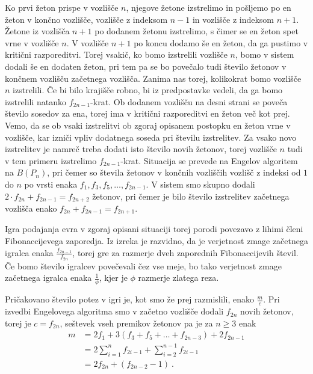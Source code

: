 \documentclass[twoside,11pt]{article}
\begin{document}
\begin{dokaz}
\begin{itemize}
    Ko prvi žeton prispe v vozlišče $n$, njegove žetone izstrelimo in pošljemo po en žeton v končno vozlišče, vozlišče z indeksom $n-1$ in vozlišče z indeksom $n+1$. Žetone iz vozlišča $n+1$ po dodanem žetonu izstrelimo, s čimer se en žeton spet vrne v vozlišče $n$.
    V vozlišče $n+1$ po koncu dodamo še en žeton, da ga pustimo v kritični razporeditvi. Torej vsakič, ko bomo izstrelili vozlišče $n$, bomo v sistem dodali še en dodaten žeton, pri tem pa se bo povečalo tudi število žetonov v končnem vozlišču začetnega vozlišča.
    Zanima nas torej, kolikokrat bomo vozlišče $n$ izstrelili. Če bi bilo krajišče robno, bi iz predpostavke vedeli, da ga bomo izstrelili natanko $f_{2n-1}$-krat. Ob dodanem vozlišču na desni strani se poveča število sosedov za ena, torej ima v kritični razporeditvi en žeton več kot prej.
    Vemo, da se ob vsaki izstrelitvi ob zgoraj opisanem postopku en žeton vrne v vozlišče, kar izniči vpliv dodatnega soseda pri številu izstrelitev. Za vsako novo izstrelitev je namreč treba dodati isto število novih žetonov, torej vozlišče $n$ tudi v tem primeru izstrelimo $f_{2n-1}$-krat.
    Situacija se prevede na Engelov algoritem na $B(P_n)$, pri čemer so števila žetonov v končnih vozliščih vozlišč z indeksi od $1$ do $n$ po vrsti enaka $f_1,f_3,f_5,\ldots,f_{2n-1}$. V sistem smo skupno dodali $2\cdot f_{2n}+ f_{2n-1} = f_{2n+2}$ žetonov, pri čemer je bilo število
    izstrelitev začetnega vozlišča enako $f_{2n}+f_{2n-1}=f_{2n+1}$.
    
    

\end{itemize}
\hfill \QED

 
    
\end{dokaz}

Igra podajanja evra v zgoraj opisani situaciji torej porodi povezavo z lihimi členi Fibonaccijevega zaporedja. Iz izreka je razvidno, da je verjetnost zmage začetnega igralca enaka $\frac{f_{2n-1}}{f_{2n}}$, torej gre za razmerje dveh zaporednih Fibonaccijevih števil. Če bomo število igralcev povečevali čez vse meje,
bo tako verjetnost zmage začetnega igralca enaka $\frac{1}{\phi}$, kjer je $\phi$ razmerje zlatega reza.

Pričakovano število potez v igri je, kot smo že prej razmislili, enako $\frac{m}{c}$. Pri izvedbi Engelovega algoritma smo v začetno vozlišče dodali $f_{2n}$ novih žetonov, torej je $c=f_{2n}$, seštevek vseh premikov žetonov pa je za $n \ge 3$ enak
\begin{align*}
    m &= 2f_1+3(f_3+f_5+\ldots+f_{2n-3}) + 2f_{2n-1} \\
    &=2\sum_{i=1}^{n}f_{2i-1} + \sum_{i=2}^{n-1}f_{2i-1} \\
    &=2f_{2n} + (f_{2n-2}-1) \ .
\end{align*}
\end{document}
